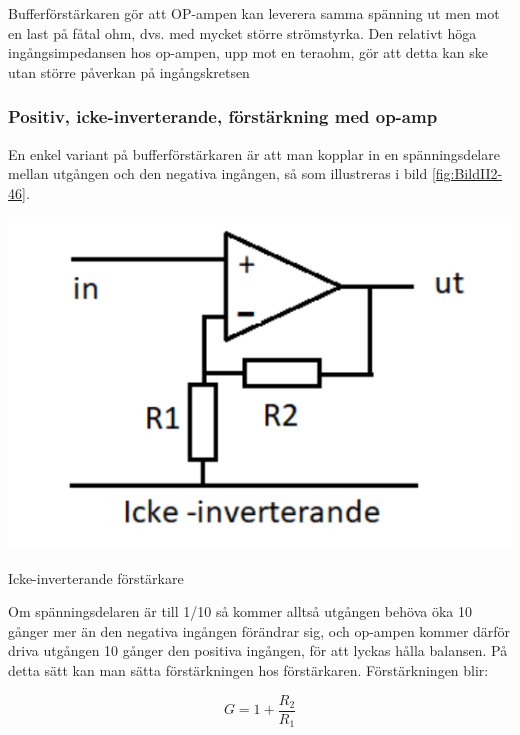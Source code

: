 Bufferförstärkaren gör att OP-ampen kan leverera samma spänning ut men mot en
last på fåtal ohm, dvs. med mycket större strömstyrka.
Den relativt höga ingångsimpedansen hos op-ampen, upp mot en teraohm, gör att detta
kan ske utan större påverkan på ingångskretsen 

\subsubsection{Positiv, icke-inverterande, förstärkning med op-amp}
\label{icke-inverterande förstärkning}

En enkel variant på bufferförstärkaren är att man kopplar in en spänningsdelare
mellan utgången och den negativa ingången, så som illustreras i bild
\ref{fig:BildII2-46}.

\begin{marginfigure}
	\includegraphics[width=\textwidth]{images/cropped_pdfs/bild_2_2-46.pdf}
	\caption{Icke-inverterande förstärkare}
	\label{fig:BildII2-46}
\end{marginfigure}

Om spänningsdelaren är till 1/10 så kommer alltså utgången behöva öka 10 gånger
mer än den negativa ingången förändrar sig, och op-ampen kommer därför driva
utgången 10 gånger den positiva ingången, för att lyckas hålla balansen.
På detta sätt kan man sätta förstärkningen hos förstärkaren.
Förstärkningen blir:

\[G = 1+ \frac{R_2}{R_1}\]


